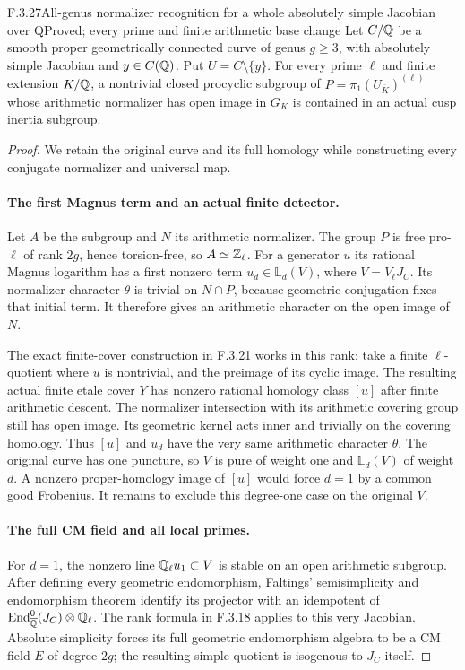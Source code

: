 \begin{result}{F.3.27}{All-genus normalizer recognition for a whole absolutely simple Jacobian over Q}{Proved; every prime and finite arithmetic base change}
Let $C/\mathbb Q$ be a smooth proper geometrically connected curve
of genus $g\geq3$, with absolutely simple Jacobian and
$y\in C(\mathbb Q)$. Put $U=C\setminus\{y\}$.
For every prime $\ell$ and finite extension $K/\mathbb Q$,
a nontrivial closed procyclic subgroup of
$P=\pi_1(U_{\overline K})^{(\ell)}$ whose arithmetic
normalizer has open image in $G_K$ is contained in
an actual cusp inertia subgroup.
\end{result}
\begin{proof}
We retain the original curve and its full homology while
constructing every conjugate normalizer and universal map.

\paragraph{The first Magnus term and an actual finite detector.}
Let $A$ be the subgroup and $N$ its arithmetic normalizer.
The group $P$ is free pro-$\ell$ of rank $2g$, hence
torsion-free, so $A\simeq\mathbb Z_\ell$. For a generator $u$
its rational Magnus logarithm has a first nonzero term
$u_d\in\mathbb L_d(V)$, where $V=V_\ell J_C$.
Its normalizer character $\theta$ is trivial on
$N\cap P$, because geometric conjugation fixes that
initial term. It therefore gives an arithmetic
character on the open image of $N$.

The exact finite-cover construction in F.3.21 works
in this rank: take a finite $\ell$-quotient where
$u$ is nontrivial, and the preimage of its cyclic
image. The resulting actual finite etale cover $Y$
has nonzero rational homology class $[u]$ after
finite arithmetic descent. The normalizer intersection
with its arithmetic covering group still has open
image. Its geometric kernel acts inner and trivially
on the covering homology. Thus $[u]$ and $u_d$
have the very same arithmetic character $\theta$.
The original curve has one puncture, so $V$ is
pure of weight one and $\mathbb L_d(V)$ of weight
$d$. A nonzero proper-homology image of $[u]$
would force $d=1$ by a common good Frobenius.
It remains to exclude this degree-one case on
the original $V$.

\paragraph{The full CM field and all local primes.}
For $d=1$, the nonzero line $\mathbb Q_\ell u_1\subset V$
is stable on an open arithmetic subgroup. After
defining every geometric endomorphism, Faltings'
semisimplicity and endomorphism theorem identify
its projector with an idempotent of
$\operatorname{End}^0_{\overline{\mathbb Q}}(J_C)\otimes\mathbb Q_\ell$.
The rank formula in F.3.18 applies to this very
Jacobian. Absolute simplicity forces its full
geometric endomorphism algebra to be a CM field
$E$ of degree $2g$; the resulting simple quotient
is isogenous to $J_C$ itself.


\end{proof}
